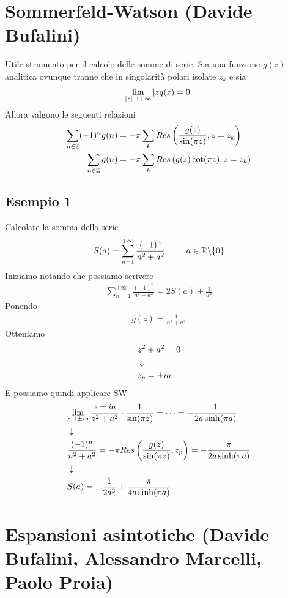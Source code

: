 \newpage

\section{Sommerfeld-Watson (Davide Bufalini)}

Utile strumento per il calcolo delle somme di serie. Sia una funzione $g(z)$ analitica ovunque tranne che in singolarità polari isolate $z_k$ e sia 
\begin{align}
	\underset{|z| \rightarrow +\infty}{\lim} \, |zq(z) =0|
\end{align}
Allora valgono le seguenti relazioni
\begin{align}
	\sum_{n\in \mathbb{Z}} (-1)^n g(n) &= -\pi \sum_{k} Res\left( \frac{g(z)}{\sin(\pi z)}, z=z_k \right)\\
	\sum_{n\in \mathbb{Z}} g(n)  &= -\pi \sum_{k} Res\left( g(z)\cot(\pi z), z=z_k \right)
\end{align}

\subsection{Esempio 1}

Calcolare la somma della serie
\begin{align}
	S(a) = \sum_{n=1}^{+\infty} \frac{(-1)^n}{n^2 + a^2} \quad ; \quad a \in \mathbb{R} \backslash \{0\}
\end{align}
Iniziamo notando che possiamo scrivere
\begin{align}
	\sum_{n=1}^{+\infty} \frac{(-1)^n}{n^2 + a^2} = 2S(a) + \frac{1}{a^2}
\end{align}
Ponendo
\begin{align}
	g(z)=\frac{1}{n^2 + a^2}
\end{align}
Otteniamo
\begin{align}
	&z^2 + a^2= 0 \\ &\downarrow \nonumber \\
	&z_p= \pm ia	
\end{align}
E possiamo quindi applicare SW
\begin{align}
	&\underset{z \rightarrow \pm ia}{\lim} \, \frac{z\pm ia}{z^2+a^2} \cdot \frac{1}{\sin(\pi z)} = \dots = -\frac{1}{2a\sinh(\pi a)} \\ &\downarrow \nonumber \\
	&\frac{(-1)^n}{n^2 + a^2} = -\pi Res \left(\frac{g(z)}{\sin(\pi z)}, z_p\right) = -\frac{\pi}{2a\sinh(\pi a)} \nonumber \\ &\downarrow \nonumber \\
	&S(a) = -\frac{1}{2a^2} + \frac{\pi}{4a\sinh(\pi a)}
\end{align}




\newpage

\section{Espansioni asintotiche (Davide Bufalini, Alessandro Marcelli, Paolo Proia)}

